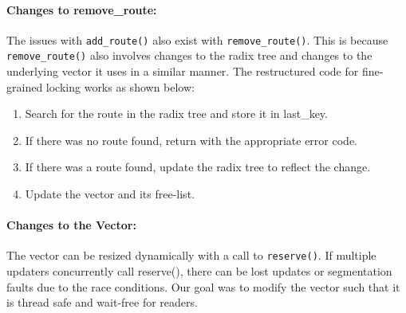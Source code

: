\documentclass[a4paper,marginparwidth=50pt,marginparsep=10pt]{article}
\begin{document}
\paragraph{Changes to remove\_route:}
The issues with \verb+add_route()+ also exist with \verb+remove_route()+. This is because \verb+remove_route()+ also involves changes to the radix tree and changes to the underlying vector it uses in a similar manner. The restructured code for fine-grained locking works as shown below:
\begin{enumerate}
\item Search for the route in the radix tree and store it in last\_key.
\item If there was no route found, return with the appropriate error code.
\item If there was a route found, update the radix tree to reflect the change. 
\item Update the vector and its free-list.
\end{enumerate}
\paragraph{Changes to the Vector:}
The vector can be resized dynamically with a call to \verb+reserve()+. If multiple updaters concurrently call reserve(), there can be lost updates or segmentation faults due to the race conditions. Our goal was to modify the vector such that it is thread safe and wait-free for readers.\\
\end{document}
